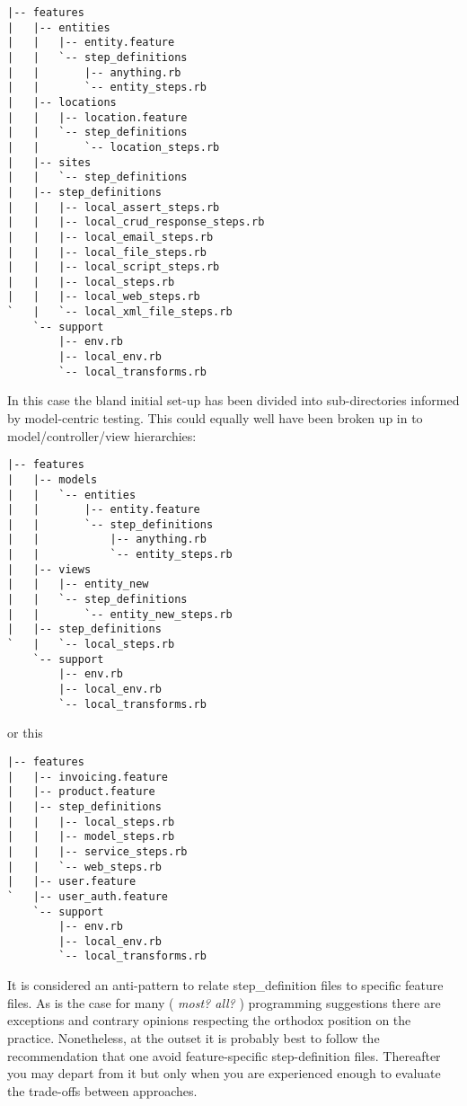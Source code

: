 \begin{verbatim}
|-- features
|   |-- entities
|   |   |-- entity.feature
|   |   `-- step_definitions
|   |       |-- anything.rb
|   |       `-- entity_steps.rb
|   |-- locations
|   |   |-- location.feature
|   |   `-- step_definitions
|   |       `-- location_steps.rb
|   |-- sites
|   |   `-- step_definitions
|   |-- step_definitions
|   |   |-- local_assert_steps.rb
|   |   |-- local_crud_response_steps.rb
|   |   |-- local_email_steps.rb
|   |   |-- local_file_steps.rb
|   |   |-- local_script_steps.rb
|   |   |-- local_steps.rb
|   |   |-- local_web_steps.rb
`   |   `-- local_xml_file_steps.rb   
    `-- support
        |-- env.rb
        |-- local_env.rb
        `-- local_transforms.rb

\end{verbatim}
In this case the bland initial set-up has been divided into sub-directories informed by model-centric testing.  This could equally well have been broken up in to model/controller/view hierarchies:

\begin{verbatim}
|-- features
|   |-- models
|   |   `-- entities
|   |       |-- entity.feature
|   |       `-- step_definitions
|   |           |-- anything.rb
|   |           `-- entity_steps.rb
|   |-- views
|   |   |-- entity_new
|   |   `-- step_definitions
|   |       `-- entity_new_steps.rb
|   |-- step_definitions
`   |   `-- local_steps.rb
    `-- support
        |-- env.rb
        |-- local_env.rb
        `-- local_transforms.rb

\end{verbatim}
or this
\begin{verbatim}
|-- features
|   |-- invoicing.feature
|   |-- product.feature
|   |-- step_definitions
|   |   |-- local_steps.rb
|   |   |-- model_steps.rb
|   |   |-- service_steps.rb
|   |   `-- web_steps.rb
|   |-- user.feature
`   |-- user_auth.feature
    `-- support
        |-- env.rb
        |-- local_env.rb
        `-- local_transforms.rb

\end{verbatim}
It is considered an anti-pattern to relate step\_definition files to specific feature files.  As is the case for many ( \emph{most? all?} ) programming suggestions there are exceptions and contrary opinions respecting the orthodox position on the practice.  Nonetheless,  at the outset it is probably best to follow the recommendation that one avoid feature-specific step-definition files.  Thereafter you may depart from it but only when you are experienced enough to evaluate the trade-offs between approaches.

